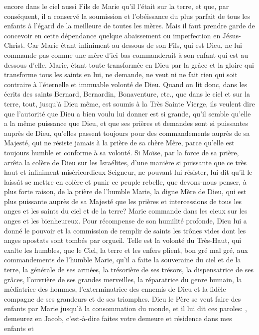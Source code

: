 encore dans le ciel aussi Fils de Marie qu'il l'était sur la terre, et que, par conséquent, il a conservé la soumission
et l'obéissance du plus parfait de tous les enfants à l'égard de la meilleure de toutes les mères. Mais il faut prendre
garde de concevoir en cette dépendance quelque abaissement ou imperfection en Jésus-Christ. Car Marie étant
infiniment au dessous de son Fils, qui est Dieu, ne lui commande pas comme une mère d'ici bas commanderait à
son enfant qui est au-dessous d'elle. Marie, étant toute transformée en Dieu par la grâce et la gloire qui transforme
tous les saints en lui, ne demande, ne veut ni ne fait rien qui soit contraire à l'éternelle et immuable volonté de
Dieu. Quand on lit donc, dans les écrits des saints Bernard, Bernardin, Bonaventure, etc., que dans le ciel et sur la
terre, tout, jusqu'à Dieu même, est soumis à la Très Sainte Vierge, ils veulent dire que l'autorité que Dieu a bien
voulu lui donner est si grande, qu'il semble qu'elle a la même puissance que Dieu, et que ses prières et demandes
sont si puissantes auprès de Dieu, qu'elles passent toujours pour des commandements auprès de sa Majesté, qui
ne résiste jamais à la prière de sa chère Mère, parce qu'elle est toujours humble et conforme à sa volonté.
Si Moïse, par la force de sa prière, arrêta la colère de Dieu sur les Israélites, d'une manière si puissante que ce
très haut et infiniment miséricordieux Seigneur, ne pouvant lui résister, lui dit qu'il le laissât se mettre en colère et
punir ce peuple rebelle, que devons-nous penser, à plus forte raison, de la prière de l'humble Marie, la digne Mère
de Dieu, qui est plus puissante auprès de sa Majesté que les prières et intercessions de tous les anges et les
saints du ciel et de la terre?
 Marie commande dans les cieux sur les anges et les bienheureux. Pour récompense de son humilité profonde,
Dieu lui a donné le pouvoir et la commission de remplir de saints les trônes vides dont les anges apostats sont
tombés par orgueil. Telle est la volonté du Très-Haut, qui exalte les humbles, que le Ciel, la terre et les enfers
plient, bon gré mal gré, aux commandements de l'humble Marie, qu'il a faite la souveraine du ciel et de la terre, la
générale de ses armées, la trésorière de ses trésors, la dispensatrice de ses grâces, l'ouvrière de ses grandes
merveilles, la réparatrice du genre humain, la médiatrice des hommes, l'exterminatrice des ennemis de Dieu et la
fidèle compagne de ses grandeurs et de ses triomphes.
 Dieu le Père se veut faire des enfants par Marie jusqu'à la consommation du monde, et il lui dit ces paroles: , demeurez en Jacob, c'est-à-dire faites votre demeure et résidence dans mes enfants et
